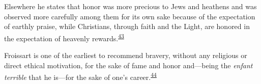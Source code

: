 Elsewhere he states that honor was more precious to Jews and heathens
and was observed more carefully among them for its own sake because of
the expectation of earthly praise, while Christians, through faith and
the Light, are honored in the expectation of heavenly
rewards.\textsuperscript{\protect\hypertarget{10_Chapter_Three__THE_HEROIC_DREAM.xhtmlux5cux23id_1847}{\protect\hyperlink{23_NOTES.xhtmlux5cux23id_1848}{43}}}

\protect\hypertarget{10_Chapter_Three__THE_HEROIC_DREAM.xhtmlux5cux23page_75}{}{}Froissart
is one of the earliest to recommend bravery, without any religious or
direct ethical motivation, for the sake of fame and honor and---being
the \emph{enfant terrible} that he is---for the sake of one's
career.\textsuperscript{\protect\hypertarget{10_Chapter_Three__THE_HEROIC_DREAM.xhtmlux5cux23id_1845}{\protect\hyperlink{23_NOTES.xhtmlux5cux23id_1846}{44}}}

